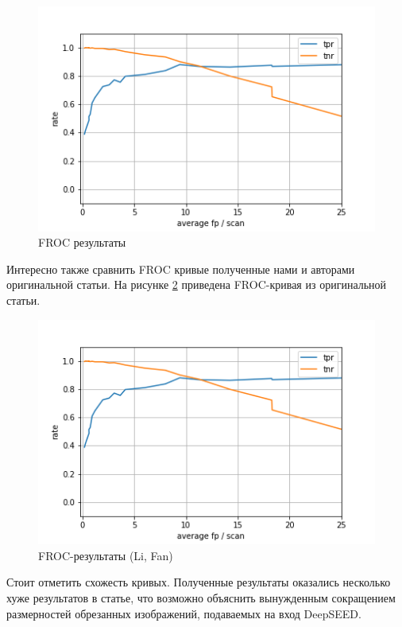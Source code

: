 \begin{figure}[!h]
\includegraphics[width=\linewidth]{images/froc.png}
\caption{FROC результаты}\label{froc-baseline}
\centering
\end{figure}

Интересно также сравнить FROC кривые полученные нами и авторами оригинальной статьи. На рисунке \ref{froc-lifan} приведена FROC-кривая из оригинальной статьи.

\begin{figure}[!h]
\includegraphics[width=\linewidth]{images/froc.png}
\caption{FROC-результаты (Li, Fan)}\label{froc-lifan}
\centering
\end{figure}

Стоит отметить схожесть кривых. Полученные результаты оказались несколько хуже результатов в статье, что возможно объяснить вынужденным сокращением размерностей обрезанных изображений, подаваемых на вход DeepSEED.

